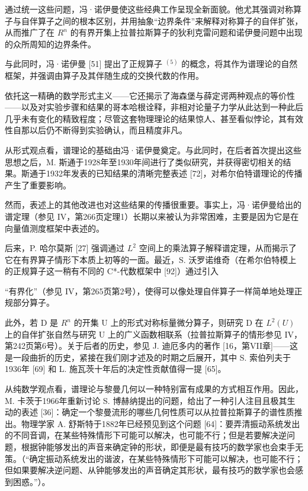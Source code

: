 通过统一这些问题，冯·诺伊曼使这些经典工作呈现全新面貌。他尤其强调对称算子与自伴算子之间的根本区别，并用抽象“边界条件”来解释对称算子的自伴扩张，从而推广了在 \(R^{n}\) 的有界开集上拉普拉斯算子的狄利克雷问题和诺伊曼问题中出现的众所周知的边界条件。

与此同时，冯·诺伊曼 {[}51{]} 提出了正规算子 \(^{(5)}\) 的概念，将其作为谱理论的自然框架，并强调由算子及其伴随生成的交换代数的作用。

依托这一精确的数学形式主义——它还揭示了海森堡与薛定谔两种观点的等价性——以及对实验步骤和结果的哥本哈根诠释，非相对论量子力学从此达到一种此后几乎未有变化的精致程度；尽管这套物理理论的结果惊人、甚至看似悖论，其有效性自那以后仍不断得到实验确认，而且精度非凡。

从形式观点看，谱理论的基础由冯·诺伊曼奠定。与此同时，在后者首次提出这些思想之后，M. 斯通于1928年至1930年间进行了类似研究，并获得密切相关的结果。斯通于1932年发表的已知结果的清晰完整表述 {[}72{]}，对希尔伯特谱理论的传播产生了重要影响。

然而，表述上的其他改进也对这些结果的传播很重要。事实上，冯·诺伊曼给出的谱定理（参见 IV，第266页定理1）长期以来被认为非常困难，主要是因为它是在向量值测度框架中表述的。

后来，P. 哈尔莫斯 {[}27{]} 强调通过 \(L^{2}\) 空间上的乘法算子解释谱定理，从而揭示了它在有界算子情形下本质上初等的一面。最近，S. 沃罗诺维奇（在希尔伯特模上的正规算子这一稍有不同的 C*-代数框架中 {[}92{]}）通过引入

“有界化”（参见 IV，第265页第2号），使得可以像处理自伴算子一样简单地处理正规部分算子。

此外，若 D 是 \(R^{n}\) 的开集 U 上的形式对称标量微分算子，则研究 D 在 \(L^{2}(U)\) 上的自伴扩张自然与研究 U 上的广义函数相联系（拉普拉斯算子的情形参见 IV，第242页第6号）。关于后者的历史，参见 J. 迪厄多内的著作 {[}16，第VII章{]}——这是一段曲折的历史，紧接在我们刚才述及的时期之后展开，其中 S. 索伯列夫于1936年 {[}69{]} 和 L. 施瓦茨十年后的决定性贡献值得一提 {[}65{]}。

从纯数学观点看，谱理论与黎曼几何以一种特别富有成果的方式相互作用。因此，M. 卡茨于1966年重新讨论 S. 博赫纳提出的问题，给出了一种引人注目且极其生动的表述 {[}36{]}：确定一个黎曼流形的哪些几何性质可以从拉普拉斯算子的谱性质推出。物理学家 A. 舒斯特于1882年已经预见到这个问题 {[}64{]}：要弄清振动系统发出的不同音调，在某些特殊情形下可能可以解决，也可能不行；但是若要解决逆问题，根据钟能够发出的声音来确定钟的形状，即便是最有技巧的数学家也会束手无策。（“确定振动系统发出的谐波，在某些特殊情形下可能可以解决，也可能不行；但如果要解决逆问题、从钟能够发出的声音确定其形状，最有技巧的数学家也会感到困惑。”）。


